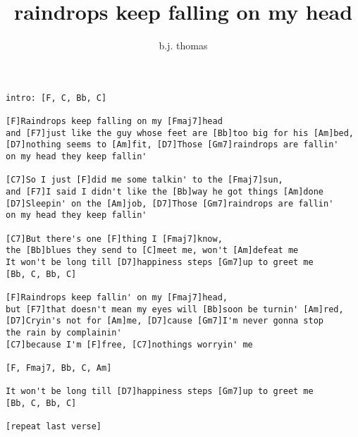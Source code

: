 \author{b.j. thomas}
\title{raindrops keep falling on my head}
\maketitle
\begin{verbatim}
intro: [F, C, Bb, C]

[F]Raindrops keep falling on my [Fmaj7]head
and [F7]just like the guy whose feet are [Bb]too big for his [Am]bed,
[D7]nothing seems to [Am]fit, [D7]Those [Gm7]raindrops are fallin'
on my head they keep fallin'

[C7]So I just [F]did me some talkin' to the [Fmaj7]sun,
and [F7]I said I didn't like the [Bb]way he got things [Am]done
[D7]Sleepin' on the [Am]job, [D7]Those [Gm7]raindrops are fallin'
on my head they keep fallin'

[C7]But there's one [F]thing I [Fmaj7]know,
the [Bb]blues they send to [C]meet me, won't [Am]defeat me
It won't be long till [D7]happiness steps [Gm7]up to greet me
[Bb, C, Bb, C]

[F]Raindrops keep fallin' on my [Fmaj7]head,
but [F7]that doesn't mean my eyes will [Bb]soon be turnin' [Am]red,
[D7]Cryin's not for [Am]me, [D7]cause [Gm7]I'm never gonna stop
the rain by complainin'
[C7]because I'm [F]free, [C7]nothings worryin' me

[F, Fmaj7, Bb, C, Am]

It won't be long till [D7]happiness steps [Gm7]up to greet me
[Bb, C, Bb, C]

[repeat last verse]
\end{verbatim}